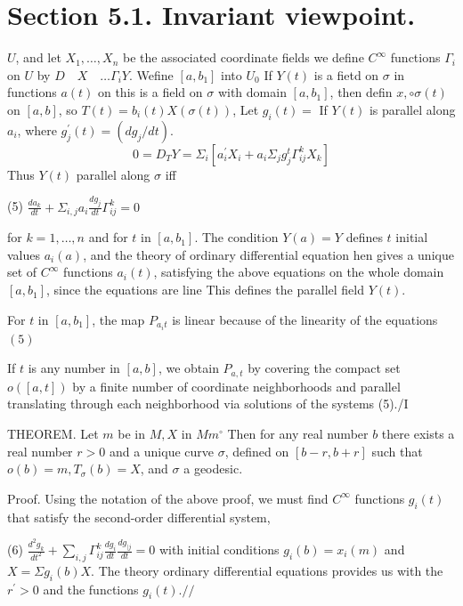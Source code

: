 \documentclass[10pt]{article}
\begin{document}
\section{Section 5.1. Invariant viewpoint.}
$U$, and let $X_{1}, \ldots, X_{n}$ be the associated coordinate fields we define $C^{\infty}$ functions $\Gamma_{i}$ on $U$ by $D \quad X \quad \ldots \Gamma_{i} Y$. Wefine $\left[a, b_{1}\right]$ into $U_{0}$ If $Y(t)$ is a fietd on $\sigma$ in functions $a(t)$ on this is a field on $\sigma$ with domain $\left[a, b_{1}\right]$, then defin $x, \circ \sigma(t)$ on $[a, b]$, so $T(t)=b_{i}(t) X(\sigma(t))$, Let $g_{i}(t)=$ If $Y(t)$ is parallel along $a_{i}$, where $g_{j}^{\prime}(t)=\left(d g_{j} / d t\right)$.
$$
0=D_{T} Y=\Sigma_{i}\left[a_{i}^{\prime} X_{i}+a_{i} \Sigma_{j} g_{j}^{t} \Gamma_{i j}^{k} X_{k}\right]
$$
Thus $Y(t)$ parallel along $\sigma$ iff

(5) $\frac{d a_{k}}{d t}+\Sigma_{i, j} a_{i} \frac{d g_{j}}{d t} \Gamma_{i j}^{k}=0$

for $k=1, \ldots, n$ and for $t$ in $\left[a, b_{1}\right]$. The condition $Y(a)=Y$ defines $t$ initial values $a_{i}(a)$, and the theory of ordinary differential equation hen gives a unique set of $C^{\infty}$ functions $a_{i}(t)$, satisfying the above equations on the whole domain $\left[a, b_{1}\right]$, since the equations are line This defines the parallel field $Y(t)$.

For $t$ in $\left[a, b_{1}\right]$, the map $P_{a_{i} t}$ is linear because of the linearity of the equations $(5)$

If $t$ is any number in $[a, b]$, we obtain $P_{a, t}$ by covering the compact set $o([a, t])$ by a finite number of coordinate neighborhoods and parallel translating through each neighborhood via solutions of the systems (5)./I

THEOREM. Let $m$ be in $M, X$ in $M m^{\circ}$ Then for any real number $b$ there exists a real number $r>0$ and a unique curve $\sigma$, defined on $[b-r, b+r]$ such that $o(b)=m, T_{\sigma}(b)=X$, and $\sigma$ a geodesic.

Proof. Using the notation of the above proof, we must find $C^{\infty}$ functions $g_{i}(t)$ that satisfy the second-order differential system,

(6) $\frac{d^{2} g_{k}}{d t^{2}}+\sum_{i, j} \Gamma_{i j}^{k} \frac{d g_{i}}{d t} \frac{d g_{\mid j}}{d t}=0$ with initial conditions $g_{i}(b)=x_{i}(m)$ and $X=\Sigma g_{i}(b) X$. The theory ordinary differential equations provides us with the $r^{\prime}>0$ and the functions $g_{i}(t) . / /$
\end{document}

